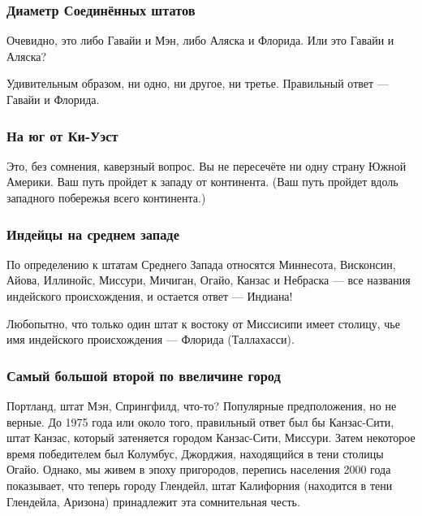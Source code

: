                             
                                                                                                                                     
\subsubsection*{Диаметр Соединённых штатов}%


Очевидно, это либо Гавайи и Мэн, либо Аляска и Флорида. Или это Гавайи и Аляска?


Удивительным образом, ни одно, ни другое, ни третье.  Правильный ответ --- Гавайи и Флорида.\heart




\subsubsection*{На юг от Ки-Уэст}%


Это, без сомнения, каверзный  вопрос. %
Вы не пересечёте ни одну страну Южной Америки. 
Ваш путь пройдет к западу от континента. 
(Ваш путь пройдет вдоль западного побережья всего континента.)\heart


\subsubsection*{Индейцы на среднем западе}%


По определению к штатам  Среднего Запада относятся Миннесота, Висконсин, Айова,
Иллинойс, Миссури, Мичиган, Огайо, Канзас и Небраска --- все названия индейского
происхождения, и остается ответ --- Индиана!\heart


Любопытно, что только один штат к востоку от Миссисипи имеет столицу, чье имя индейского происхождения --- Флорида (Таллахасси).




\subsubsection*{Самый большой второй по ввеличине город}%


Портланд, штат Мэн, Спрингфилд, что-то?  Популярные предположения, но не верные.
До 1975 года или около того, правильный ответ был бы Канзас-Сити, штат Канзас, который затеняется городом Канзас-Сити, Миссури.
Затем некоторое время победителем был Колумбус, Джорджия, находящийся в тени столицы Огайо. Однако, мы живем в эпоху пригородов, %
перепись населения 2000 года показывает, что теперь городу Глендейл, штат Калифорния (находится в тени Глендейла, Аризона) принадлежит эта сомнительная %
честь.\heart




